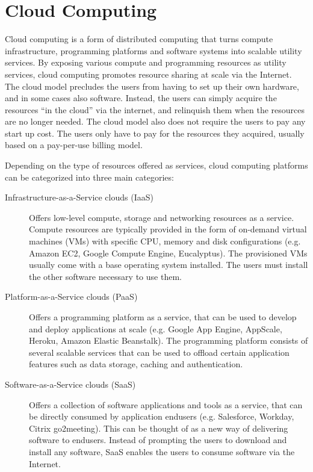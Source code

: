 \section{Cloud Computing}

Cloud computing is a form of distributed computing that turns compute infrastructure, programming
platforms and software systems into scalable utility services. By exposing various compute and programming
resources as utility services, cloud computing promotes resource sharing at scale via the Internet.
The cloud model precludes the users from having to set up their own hardware, and in some cases also software. Instead,
the users can simply acquire the resources ``in the cloud'' via the internet, and relinquish them when
the resources are no longer needed. The cloud model also does not require the users to pay any start up
cost. The users only have to pay for the resources they acquired, usually based on a pay-per-use
billing model.

Depending on the type of resources
offered as services, cloud computing platforms can be categorized into three main categories:
\begin{description}
\item [Infrastructure-as-a-Service clouds (IaaS)]
Offers low-level compute, storage and networking
resources as a service. Compute resources are typically provided in the form of on-demand virtual machines (VMs)
with specific CPU, memory and disk configurations (e.g. Amazon EC2, Google Compute Engine, Eucalyptus). 
The provisioned VMs usually come with a base operating system installed. The users must install the other software
necessary to use them.
\item [Platform-as-a-Service clouds (PaaS)]
Offers a programming platform as a service, that can be used to develop and deploy applications at scale 
(e.g. Google App Engine, AppScale, Heroku, Amazon Elastic Beanstalk). The programming platform consists
of several scalable services that can be used to offload certain application features such as data storage, caching
and authentication.
\item [Software-as-a-Service clouds (SaaS)]
Offers a collection of software applications and tools as a service, that can be directly consumed by
application endusers (e.g. Salesforce, Workday, Citrix go2meeting). This can be thought of as a new way 
of delivering software to
endusers. Instead of prompting the users to download and install any software, SaaS enables the users
to consume software via the Internet.  
\end{description}

